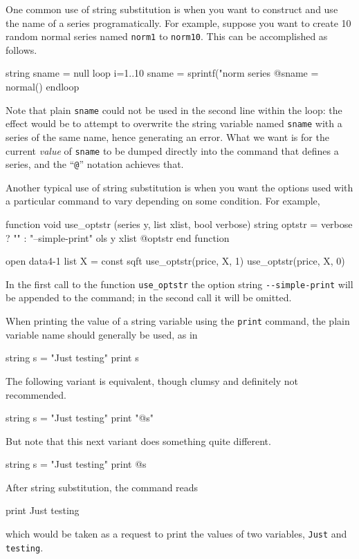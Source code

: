 One common use of string substitution is when you want to construct
and use the name of a series programatically. For example, suppose you
want to create 10 random normal series named \texttt{norm1} to
\texttt{norm10}. This can be accomplished as follows.
%
\begin{code}
string sname = null
loop i=1..10
  sname = sprintf("norm%
  series @sname = normal()
endloop
\end{code}
%
Note that plain \texttt{sname} could not be used in the second line
within the loop: the effect would be to attempt to overwrite the
string variable named \texttt{sname} with a series of the same name,
hence generating an error. What we want is for the current
\textit{value} of \texttt{sname} to be dumped directly into the
command that defines a series, and the ``\verb|@|'' notation achieves
that.

Another typical use of string substitution is when you want the
options used with a particular command to vary depending on
some condition. For example,
%
\begin{code}
function void use_optstr (series y, list xlist, bool verbose)
   string optstr = verbose ? "" : "--simple-print"
   ols y xlist @optstr 
end function

open data4-1
list X = const sqft
use_optstr(price, X, 1)
use_optstr(price, X, 0)
\end{code}

In the first call to the function \texttt{use\_optstr} the option
string \verb|--simple-print| will be appended to the 
command; in the second call it will be omitted.

When printing the value of a string variable using the \texttt{print}
command, the plain variable name should generally be used, as in
%
\begin{code}
string s = "Just testing"
print s
\end{code}
%
The following variant is equivalent, though clumsy and definitely not
recommended.
%
\begin{code}
string s = "Just testing"
print "@s"
\end{code}
%
But note that this next variant does something quite different.
%
\begin{code}
string s = "Just testing"
print @s
\end{code}
%
After string substitution, the command reads
%
\begin{code}
print Just testing
\end{code}
%
which would be taken as a request to print the values of two
variables, \texttt{Just} and \texttt{testing}.

